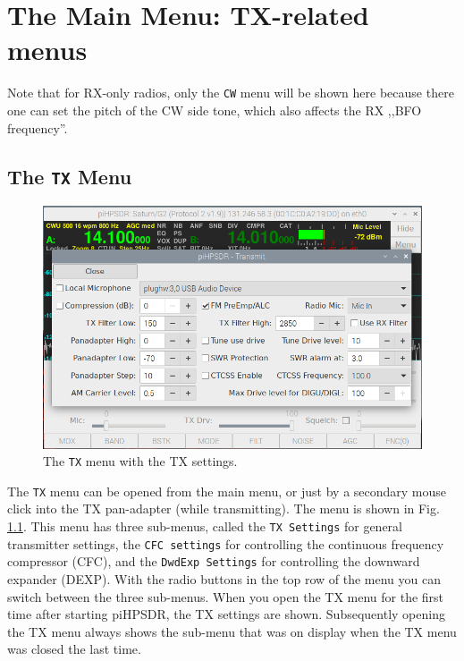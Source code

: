 \documentclass[12pt]{book}
\def\rett#1{\texttt{\color{red}#1}}
\def\bltt#1{\texttt{\color{blue}#1}}
\def\pH{pi\-HPSDR\xspace}
\begin{document}
\chapter[TX-related menus]{The Main Menu: TX-related menus}

Note that for RX-only radios, only the \bltt{CW} menu will be shown here
because there one can set the pitch of the CW side tone, which also affects
the RX ,,BFO frequency''.

\section{The \texttt{TX} Menu}
\label{sec:txmenu}
\begin{figure}[ht!]
\center
\includegraphics[width=12cm]{TXMenu.png}
\caption{The \bltt{TX} menu with the TX settings.}
\label{fig:TXMenu}
\end{figure}

The \bltt{TX} menu can be opened from the main menu, or just by a secondary mouse click
into the TX pan-adapter (while transmitting). The menu is shown in Fig. \ref{fig:TXMenu}.
This menu has three sub-menus, called the \rett{TX Settings} for general transmitter settings,
the \rett{CFC settings} for controlling the continuous frequency compressor (CFC), and the
\rett{DwdExp Settings} for controlling the downward expander (DEXP). With the radio buttons
in the top row of the menu you can switch between the three sub-menus. When you open the TX
menu for the first time after starting \pH, the TX settings are shown. Subsequently opening
the TX menu always shows the sub-menu that was on display when the TX  menu was closed the last
time.
\end{document}
